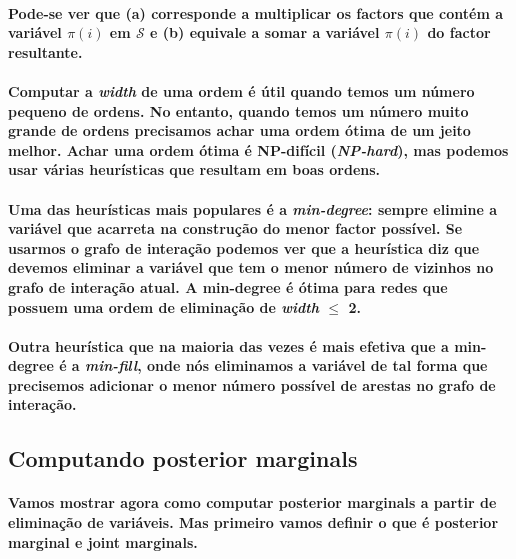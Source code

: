 \documentclass[a4paper,10pt]{article}
\theoremstyle{plain}
\begin{document}
\paragraph{
  Pode-se ver que (a) corresponde a multiplicar os factors que contém a variável $\pi(i)$ em 
  $\mathcal{S}$ e (b) equivale a somar a variável $\pi(i)$ do factor resultante.
}

\paragraph{
  Computar a \textit{width} de uma ordem é útil quando temos um número pequeno de ordens. No
  entanto, quando temos um número muito grande de ordens precisamos achar uma ordem ótima de um
  jeito melhor. Achar uma ordem ótima é NP-difícil (\textit{NP-hard}), mas podemos usar várias
  heurísticas que resultam em boas ordens.
}

\paragraph{
  Uma das heurísticas mais populares é a \textit{min-degree}: sempre elimine a variável que 
  acarreta na construção do menor factor possível. Se usarmos o grafo de interação podemos ver que
  a heurística diz que devemos eliminar a variável que tem o menor número de vizinhos no grafo de
  interação atual. A min-degree é ótima para redes que possuem uma ordem de eliminação de 
  \textit{width} $\leq$ 2.
}

\paragraph{
  Outra heurística que na maioria das vezes é mais efetiva que a min-degree é a \textit{min-fill},
  onde nós eliminamos a variável de tal forma que precisemos adicionar o menor número possível de
  arestas no grafo de interação.
}

\subsection{Computando posterior marginals}

\paragraph{
  Vamos mostrar agora como computar posterior marginals a partir de eliminação de variáveis. Mas
  primeiro vamos definir o que é posterior marginal e joint marginals.
}
\end{document}
